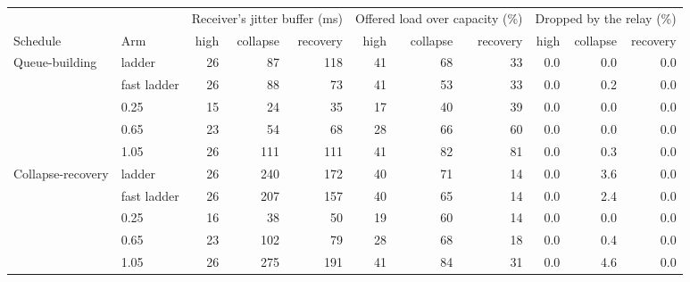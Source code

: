 \begin{tabular}{llrrrrrrrrr}
\toprule
 & & \multicolumn{3}{c}{Receiver's jitter buffer (ms)} & \multicolumn{3}{c}{Offered load over capacity (\%)} & \multicolumn{3}{c}{Dropped by the relay (\%)} \\
Schedule & Arm & high & collapse & recovery & high & collapse & recovery & high & collapse & recovery \\
\midrule
Queue-building & ladder & 26 & 87 & 118 & 41 & 68 & 33 & 0.0 & 0.0 & 0.0 \\
 & fast ladder & 26 & 88 & 73 & 41 & 53 & 33 & 0.0 & 0.2 & 0.0 \\
 & 0.25 & 15 & 24 & 35 & 17 & 40 & 39 & 0.0 & 0.0 & 0.0 \\
 & 0.65 & 23 & 54 & 68 & 28 & 66 & 60 & 0.0 & 0.0 & 0.0 \\
 & 1.05 & 26 & 111 & 111 & 41 & 82 & 81 & 0.0 & 0.3 & 0.0 \\
\midrule
Collapse-recovery & ladder & 26 & 240 & 172 & 40 & 71 & 14 & 0.0 & 3.6 & 0.0 \\
 & fast ladder & 26 & 207 & 157 & 40 & 65 & 14 & 0.0 & 2.4 & 0.0 \\
 & 0.25 & 16 & 38 & 50 & 19 & 60 & 14 & 0.0 & 0.0 & 0.0 \\
 & 0.65 & 23 & 102 & 79 & 28 & 68 & 18 & 0.0 & 0.4 & 0.0 \\
 & 1.05 & 26 & 275 & 191 & 41 & 84 & 31 & 0.0 & 4.6 & 0.0 \\
\bottomrule
\end{tabular}
